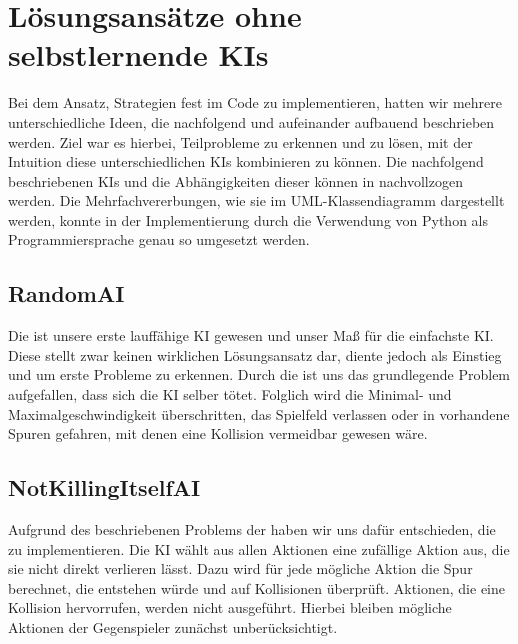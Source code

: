 \section{Lösungsansätze ohne selbstlernende KIs}
\label{sec:loesungsansatz-ohne-selbstlernende-kis}

Bei dem Ansatz, Strategien fest im Code zu implementieren, hatten wir mehrere unterschiedliche Ideen,
die nachfolgend und aufeinander aufbauend beschrieben werden.
Ziel war es hierbei, Teilprobleme zu erkennen und zu lösen, mit der Intuition diese unterschiedlichen \ac{KI}s
kombinieren zu können.
Die nachfolgend beschriebenen \ac{KI}s und die Abhängigkeiten dieser können in 
nachvollzogen werden.
Die Mehrfachvererbungen, wie sie im UML-Klassendiagramm dargestellt werden, konnte in der Implementierung durch die
Verwendung von Python als Programmiersprache genau so umgesetzt werden.

\subsection{RandomAI}
\label{subsec:random-ai}

Die  ist unsere erste lauffähige KI gewesen und unser Maß für die einfachste \ac{KI}.
Diese stellt zwar keinen wirklichen Lösungsansatz dar, diente jedoch als Einstieg und um erste Probleme zu erkennen.
Durch die  ist uns das grundlegende Problem aufgefallen, dass sich die \ac{KI} selber tötet.
Folglich wird die Minimal- und Maximalgeschwindigkeit überschritten, das Spielfeld verlassen oder in vorhandene Spuren
gefahren, mit denen eine Kollision vermeidbar gewesen wäre.

\subsection{NotKillingItselfAI}
\label{subsec:notkillingitself-ai}

Aufgrund des beschriebenen Problems der  haben wir uns dafür entschieden, die 
zu implementieren.
Die \ac{KI} wählt aus allen Aktionen eine zufällige Aktion aus, die sie nicht direkt verlieren lässt.
Dazu wird für jede mögliche Aktion die Spur berechnet, die entstehen würde und auf Kollisionen überprüft.
Aktionen, die eine Kollision hervorrufen, werden nicht ausgeführt.
Hierbei bleiben mögliche Aktionen der Gegenspieler zunächst unberücksichtigt. \\

